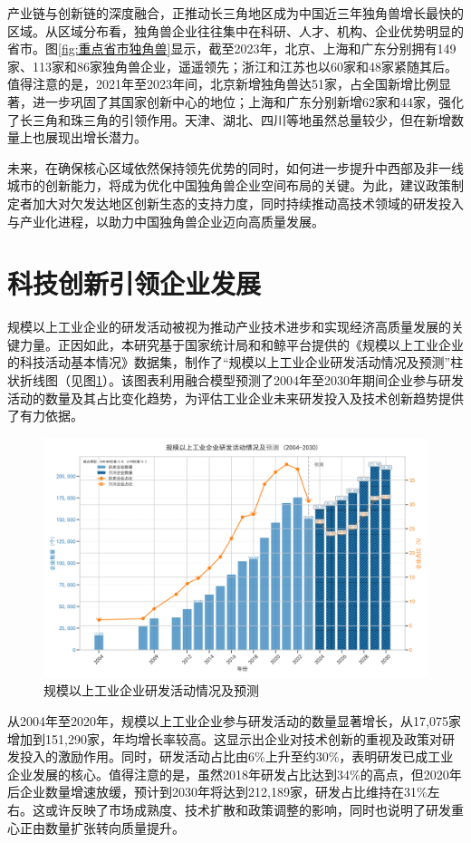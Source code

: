 产业链与创新链的深度融合，正推动长三角地区成为中国近三年独角兽增长最快的区域。从区域分布看，独角兽企业往往集中在科研、人才、机构、企业优势明显的省市。图\ref{fig:重点省市独角兽}显示，截至2023年，北京、上海和广东分别拥有149家、113家和86家独角兽企业，遥遥领先；浙江和江苏也以60家和48家紧随其后。值得注意的是，2021年至2023年间，北京新增独角兽达51家，占全国新增比例显著，进一步巩固了其国家创新中心的地位；上海和广东分别新增62家和44家，强化了长三角和珠三角的引领作用。天津、湖北、四川等地虽然总量较少，但在新增数量上也展现出增长潜力。

未来，在确保核心区域依然保持领先优势的同时，如何进一步提升中西部及非一线城市的创新能力，将成为优化中国独角兽企业空间布局的关键。为此，建议政策制定者加大对欠发达地区创新生态的支持力度，同时持续推动高技术领域的研发投入与产业化进程，以助力中国独角兽企业迈向高质量发展。

\section{科技创新引领企业发展}
规模以上工业企业的研发活动被视为推动产业技术进步和实现经济高质量发展的关键力量。正因如此，本研究基于国家统计局和和鲸平台提供的《规模以上工业企业的科技活动基本情况》数据集，制作了“规模以上工业企业研发活动情况及预测”柱状折线图（见图\ref{规模以上工业企业研发活动情况及预测}）。该图表利用融合模型预测了2004年至2030年期间企业参与研发活动的数量及其占比变化趋势，为评估工业企业未来研发投入及技术创新趋势提供了有力依据。

\begin{figure}[H]
    \centering
    \includegraphics[width=0.7\linewidth]{figure/12规模以上工业企业研发活动情况及预测.png}
    \caption{规模以上工业企业研发活动情况及预测}
    \label{规模以上工业企业研发活动情况及预测}
\end{figure}


从2004年至2020年，规模以上工业企业参与研发活动的数量显著增长，从17,075家增加到151,290家，年均增长率较高。这显示出企业对技术创新的重视及政策对研发投入的激励作用\cite{WenZhao2021}。同时，研发活动占比由6\%上升至约30\%，表明研发已成工业企业发展的核心。值得注意的是，虽然2018年研发占比达到34\%的高点，但2020年后企业数量增速放缓，预计到2030年将达到212,189家，研发占比维持在31\%左右。这或许反映了市场成熟度、技术扩散和政策调整的影响，同时也说明了研发重心正由数量扩张转向质量提升。

